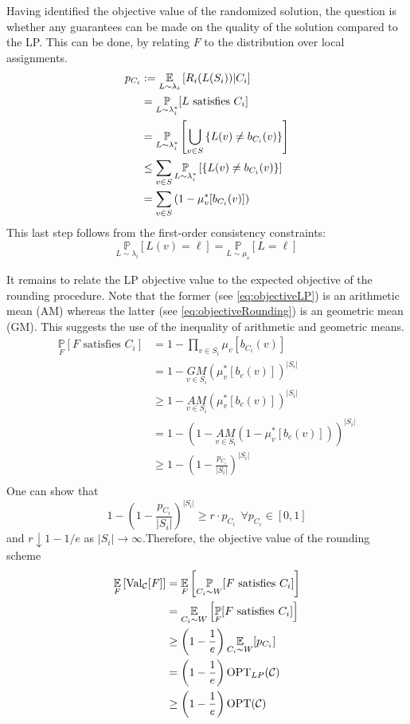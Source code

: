 Having identified the objective value of the randomized solution, the question is whether any guarantees can be made on the quality of the solution compared to the LP. 
This can be done, by relating $F$ to the distribution over local assignments.
\begin{align}
	p_{C_i} &:=  \underset{L \sim \lambda_{i}}{\mathbb{E}} \left[ R_i( L (S_i )) |C_i \right]\nonumber\\
			&= \underset{L \sim \lambda_{i}^*}{\mathbb{P}} [L \text{ satisfies } C_i] \nonumber\\
			&=  \underset{L \sim \lambda_{i}^*}{\mathbb{P}}\left[ \bigcup_{v \in S} \left\{ L(v) \neq b_{C_i}(v) \right\} \right] \nonumber\\
			&\le \sum_{v \in  S } \underset{L \sim \lambda_{i}^*}{\mathbb{P}} \left[  \left\{ L(v) \neq b_{C_i}(v) \right\} \right] \nonumber\\
			&= \sum_{v \in S} \left( 1 - \mu_v^*[b_{C_i}(v)] \right) \label{eq:objectiveLP}
\end{align}
This last step follows from the first-order consistency constraints:
\[
	\underset{L \sim \lambda_{i} }{\mathbb{P}}[ L(v) = \ell] = \underset{L \sim \mu_v }{\mathbb{P}}[ L = \ell]
\]

It remains to relate the LP objective value to the expected objective of the rounding procedure. 
Note that the former (see \eqref{eq:objectiveLP}) is an arithmetic mean (AM) whereas the latter (see \eqref{eq:objectiveRounding}) is an geometric mean (GM). 
This suggests the use of the inequality of arithmetic and geometric means.
\begin{align*}
		\underset{F}{\mathbb{P}}[ F \text{ satisfies } C_i] &= 1 - \prod_{v \in S_i} \mu_v[b_{C_i}(v)]\\
		&= 1 - \underset{v \in S_i}{GM}(\mu_{v}^*[b_c(v)])^{|S_i|}\\
		&\ge 1 - \underset{v \in S_i}{AM}(\mu_{v}^*[b_c(v)])^{|S_i|}\\
		&= 1 - \left( 1  - \underset{v \in S_i}{AM}(1 -\mu_{v}^*[b_c(v)]) \right)^{|S_i|}\\
		&\ge 1 - \left( 1  - \frac{p_{C_i}}{|S_i|}\right)^{|S_i|}\\
\end{align*}
One can show that $$1 - \left( 1  - \frac{p_{C_i}}{|S_i|}\right)^{|S_i|} \geq r \cdot p_{C_i} ~\ \forall p_{C_i} \in [0, 1]$$ and $r \downarrow 1-1/e$ as $|S_i| \rightarrow \infty$.Therefore, the objective value of the rounding scheme
\begin{align*}
	\underset{F}{\mathbb{E}} \left[ \text{Val}_{\mathcal{C}}[F]\right] &= \underset{F}{\mathbb{E}}\left[ \underset{C_i \sim W}{\mathbb{P}}[ F \text{ satisfies } C_i] \right]\\
	&=  \underset{C_i \sim W}{\mathbb{E}}\left[ \underset{F}{\mathbb{P}}[ F \text{ satisfies } C_i] \right]\\
	&\ge \left( 1 - \frac{1}{e} \right) \underset{C_i \sim W}{\mathbb{E}} [ p_{C_i} ]\\
	&= \left( 1 - \frac{1}{e} \right) \text{OPT}_{LP}(\mathcal{C})\\
	&\ge \left( 1 - \frac{1}{e} \right) \text{OPT}(\mathcal{C})\\
\end{align*}

